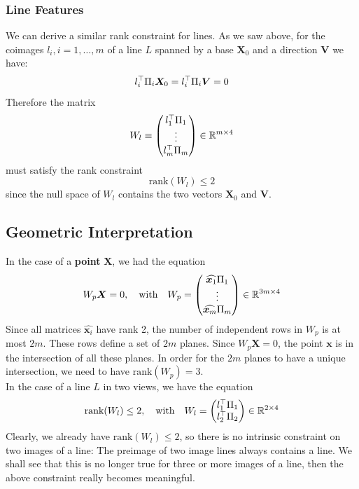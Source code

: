 \subsubsection*{Line Features}%
\label{ssub:line_features}

We can derive a similar rank constraint for lines.
As we saw above, for the coimages $l_i, i=1, \ldots, m$ of a line $L$
spanned by a base $\bm{X}_0$ and a direction $\bm{V}$ we have:
\[
	l_i^{\top} \Pi_i \bm{X}_0 = l_i^{\top} \Pi_i \bm{V} = 0
\]
Therefore the matrix
\[
	W_l \equiv \begin{pmatrix}
		l_1^{\top} \Pi_1 \\ \vdots \\ l_m^{\top} \Pi_m
	\end{pmatrix}
	\in \mathbb{R}^{m \times{} 4}
\]
must satisfy the rank constraint
\[
	\boxed{\text{rank}(W_l) \leq 2}
\]
since the null space of $W_l$ contains the two vectors $\bm{X}_0$ and $\bm{V}$.


\subsection{Geometric Interpretation}%
\label{sub:geometric_interpretation}


In the case of a \textbf{point} $\bm{X}$, we had the equation
\[
	W_p \bm{X} = 0, \quad \text{with} \quad
	W_p = \begin{pmatrix}
			\widehat{\bm{x}_1} \Pi_1 \\ \vdots \\ \widehat{\bm{x}_m} \Pi_m
		\end{pmatrix}
		\in \mathbb{R}^{3m \times{} 4}
\]
Since all matrices $\widehat{\bm{x}_i}$ have rank 2, the number of independent
rows in $W_p$ is at most $2m$. These rows define a set of $2m$ planes.
Since $W_p \bm{X} = 0$, the point $\bm{x}$ is in the intersection of all these planes.
In order for the $2m$ planes to have a unique intersection,
we need to have $\text{rank}(W_p) = 3$.\\

In the case of a line $L$ in two views, we have the equation
\[
	\text{rank}(W_l) \leq 2, \quad \text{with} \quad
	W_l = \begin{pmatrix}
		l_1^{\top} \Pi_1 \\ l_2^{\top} \Pi_2
	\end{pmatrix}
	\in \mathbb{R}^{2 \times{} 4}
\]
Clearly, we already have $\text{rank}(W_l) \leq 2$, so there is no intrinsic
constraint on two images of a line: The preimage of two image lines
always contains a line. We shall see that this is no longer true for three
or more images of a line, then the above constraint really becomes meaningful.


